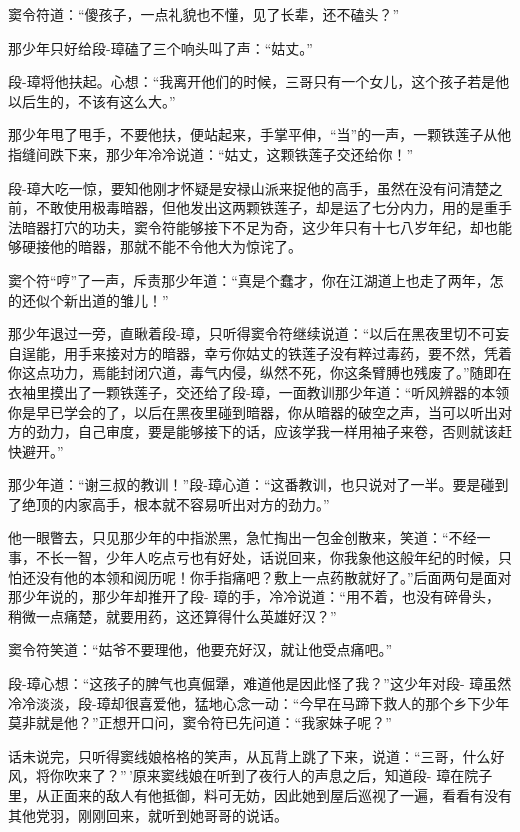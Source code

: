 \documentclass[12pt,oneside]{book}
\begin{document}
窦令符道：``傻孩子，一点礼貌也不懂，见了长辈，还不磕头？''

那少年只好给段-璋磕了三个响头叫了声：``姑丈。''

段-璋将他扶起。心想：``我离开他们的时候，三哥只有一个女儿，这个孩子若是他以后生的，不该有这么大。''

那少年甩了甩手，不要他扶，便站起来，手掌平伸，``当''的一声，一颗铁莲子从他指缝间跌下来，那少年冷冷说道：``姑丈，这颗铁莲子交还给你！''

段-璋大吃一惊，要知他刚才怀疑是安禄山派来捉他的高手，虽然在没有问清楚之前，不敢使用极毒暗器，但他发出这两颗铁莲子，却是运了七分内力，用的是重手法暗器打穴的功夫，窦令符能够接下不足为奇，这少年只有十七八岁年纪，却也能够硬接他的暗器，那就不能不令他大为惊诧了。

窦个符``哼''了一声，斥责那少年道：``真是个蠢才，你在江湖道上也走了两年，怎的还似个新出道的雏儿！''

那少年退过一旁，直瞅着段-璋，只听得窦令符继续说道：``以后在黑夜里切不可妄自逞能，用手来接对方的暗器，幸亏你姑丈的铁莲子没有粹过毒药，要不然，凭着你这点功力，焉能封闭穴道，毒气内侵，纵然不死，你这条臂膊也残废了。''随即在衣袖里摸出了一颗铁莲子，交还给了段-璋，一面教训那少年道：``听风辨器的本领你是早已学会的了，以后在黑夜里碰到暗器，你从暗器的破空之声，当可以听出对方的劲力，自己审度，要是能够接下的话，应该学我一样用袖子来卷，否则就该赶快避开。''

那少年道：``谢三叔的教训！''段-璋心道：``这番教训，也只说对了一半。要是碰到了绝顶的内家高手，根本就不容易听出对方的劲力。''

他一眼瞥去，只见那少年的中指淤黑，急忙掏出一包金创散来，笑道：``不经一事，不长一智，少年人吃点亏也有好处，话说回来，你我象他这般年纪的时候，只怕还没有他的本领和阅历呢！你手指痛吧？敷上一点药散就好了。''后面两句是面对那少年说的，那少年却推开了段-
璋的手，冷冷说道：``用不着，也没有碎骨头，稍微一点痛楚，就要用药，这还算得什么英雄好汉？''

窦令符笑道：``姑爷不要理他，他要充好汉，就让他受点痛吧。''

段-璋心想：``这孩子的脾气也真倔犟，难道他是因此怪了我？''这少年对段-
璋虽然冷冷淡淡，段-璋却很喜爱他，猛地心念一动：``今早在马蹄下救人的那个乡下少年莫非就是他？''正想开口问，窦令符已先问道：``我家妹子呢？''

话未说完，只听得窦线娘格格的笑声，从瓦背上跳了下来，说道：``三哥，什么好风，将你吹来了？''\,'原来窦线娘在听到了夜行人的声息之后，知道段-
璋在院子里，从正面来的敌人有他抵御，料可无妨，因此她到屋后巡视了一遍，看看有没有其他党羽，刚刚回来，就听到她哥哥的说话。
\end{document}

